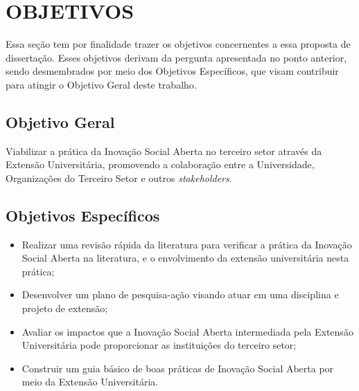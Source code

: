 \section{OBJETIVOS}
\label{objetivos}

Essa seção tem por finalidade trazer os objetivos concernentes a essa proposta de dissertação. Esses objetivos derivam da pergunta apresentada no ponto anterior, sendo desmembrados por meio dos Objetivos Específicos, que visam contribuir para atingir o Objetivo Geral deste trabalho.

\subsection{\textbf{Objetivo Geral}}
Viabilizar a prática da Inovação Social Aberta no terceiro setor através da Extensão Universitária, promovendo a colaboração entre a Universidade, Organizações do Terceiro Setor e outros \textit{stakeholders}.

\subsection{\textbf{Objetivos Específicos}}
\begin{itemize}
    \item Realizar uma revisão rápida da literatura para verificar a prática da Inovação Social Aberta na literatura, e o envolvimento da extensão universitária nesta prática;
    \item Desenvolver um plano de pesquisa-ação visando atuar em uma disciplina e projeto de extensão; 
    \item Avaliar os impactos que a Inovação Social Aberta intermediada pela Extensão Universitária pode proporcionar as instituições do terceiro setor;
    \item Construir um guia básico de boas práticas de Inovação Social Aberta por meio da Extensão Universitária.
\end{itemize}